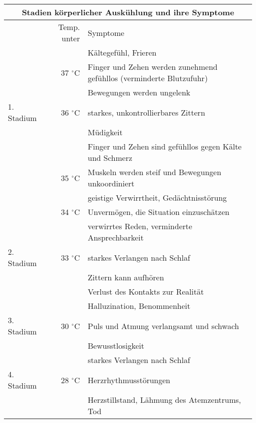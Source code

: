 \documentclass[a4paper,12pt]{scrartcl}
\begin{document}
\begin{center}
  \begin{tabular}{|l|r|p{8cm}|}
  \hline
  \multicolumn{3}{|c|}{Stadien körperlicher Auskühlung und ihre Symptome}  \\
  \hline \hline
   & Temp. unter & Symptome  \\ \hline
             &              & Kältegefühl, Frieren \\ \cline{3-3}
             & 37 $^\circ$C & Finger und Zehen werden zunehmend gefühllos (verminderte Blutzufuhr) \\ \cline{2-3}
             &              & Bewegungen werden ungelenk \\ \cline{3-3}
  1. Stadium & 36 $^\circ$C & starkes, unkontrollierbares Zittern \\ \cline{3-3}
             &              & Müdigkeit \\ \cline{2-3}
             &              & Finger und Zehen sind gefühllos gegen Kälte und Schmerz\\ \cline{3-3}
             & 35 $^\circ$C & Muskeln werden steif und Bewegungen unkoordiniert\\ \hline
             &              & geistige Verwirrtheit, Gedächtnisstörung\\ \cline{3-3}
             & 34 $^\circ$C & Unvermögen, die Situation einzuschätzen\\ \cline{2-3}
             &              & verwirrtes Reden, verminderte Ansprechbarkeit\\ \cline{3-3}
  2. Stadium & 33 $^\circ$C & starkes Verlangen nach Schlaf\\ \cline{3-3}
             &              & Zittern kann aufhören\\ \cline{3-3}
             &              & Verlust des Kontakts zur Realität\\ \hline
             &              & Halluzination, Benommenheit\\ \cline{3-3}
  3. Stadium & 30 $^\circ$C & Puls und Atmung verlangsamt und schwach\\ \cline{3-3}
             &              & Bewusstlosigkeit\\ \hline
             &              & starkes Verlangen nach Schlaf\\ \cline{3-3}
  4. Stadium & 28 $^\circ$C & Herzrhythmusstörungen\\ \cline{3-3}
             &              & Herzstillstand, Lähmung des Atemzentrums, Tod\\ \hline
  \end{tabular}
\end{center}
\end{document}
